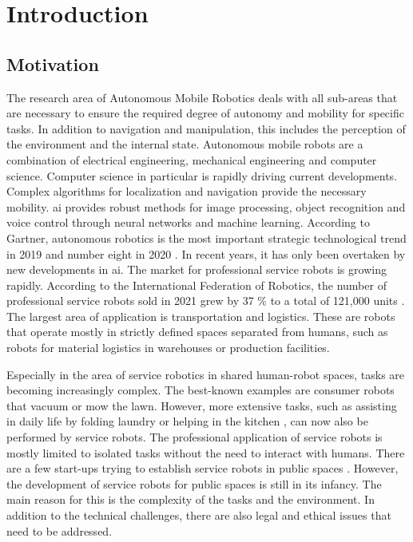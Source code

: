 \chapter{Introduction}
\label{sec:introduction}
\section{Motivation}
\label{sec:motivation}
The research area of Autonomous Mobile Robotics deals with all sub-areas that are necessary to ensure the required degree of autonomy and mobility for specific tasks. In addition to navigation and manipulation, this includes the perception of the environment and the internal state. Autonomous mobile robots are a combination of electrical engineering, mechanical engineering and computer science. Computer science in particular is rapidly driving current developments. Complex algorithms for localization and navigation provide the necessary mobility. \gls{ai} provides robust methods for image processing, object recognition and voice control through neural networks and machine learning. According to Gartner, autonomous robotics is the most important strategic technological trend in 2019 \cite{cearley_gartner_2018} and number eight in 2020 \cite{david_cearley_gartner_2019}. In recent years, it has only been overtaken by new developments in \gls{ai}. The market for professional service robots is growing rapidly. According to the International Federation of Robotics, the number of professional service robots sold in 2021 grew by 37 \% to a total of 121,000 units \cite{international_federation_of_robotics_world_2022}. The largest area of application is transportation and logistics. These are robots that operate mostly in strictly defined spaces separated from humans, such as robots for material logistics in warehouses or production facilities.

Especially in the area of service robotics in shared human-robot spaces, tasks are becoming increasingly complex. The best-known examples are consumer robots that vacuum or mow the lawn. However, more extensive tasks, such as assisting in daily life by folding laundry \cite{srivastava_tractability_2015} or helping in the kitchen \cite{becker_pr2_2011}, can now also be performed by service robots. The professional application of service robots is mostly limited to isolated tasks without the need to interact with humans. There are a few start-ups trying to establish service robots in public spaces \cite{kittmann_let_2015}. However, the development of service robots for public spaces is still in its infancy. The main reason for this is the complexity of the tasks and the environment. In addition to the technical challenges, there are also legal and ethical issues that need to be addressed.

